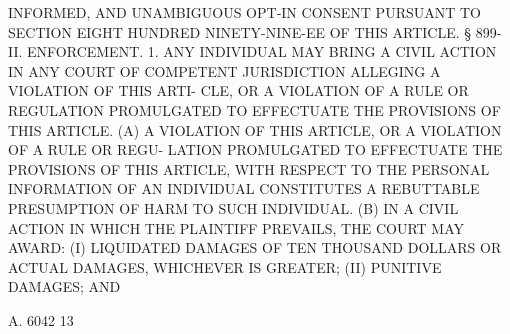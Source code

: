  INFORMED,  AND  UNAMBIGUOUS  OPT-IN  CONSENT  PURSUANT  TO SECTION EIGHT
 HUNDRED NINETY-NINE-EE OF THIS ARTICLE.
   § 899-II. ENFORCEMENT. 1. ANY INDIVIDUAL MAY BRING A CIVIL  ACTION  IN
 ANY  COURT  OF COMPETENT JURISDICTION ALLEGING A VIOLATION OF THIS ARTI-
 CLE, OR A VIOLATION OF A RULE OR REGULATION  PROMULGATED  TO  EFFECTUATE
 THE PROVISIONS OF THIS ARTICLE.
   (A)  A  VIOLATION  OF  THIS ARTICLE, OR A VIOLATION OF A RULE OR REGU-
 LATION PROMULGATED TO EFFECTUATE THE PROVISIONS OF  THIS  ARTICLE,  WITH
 RESPECT  TO  THE  PERSONAL  INFORMATION  OF  AN INDIVIDUAL CONSTITUTES A
 REBUTTABLE PRESUMPTION OF HARM TO SUCH INDIVIDUAL.
   (B) IN A CIVIL ACTION IN WHICH THE PLAINTIFF PREVAILS, THE  COURT  MAY
 AWARD:
   (I)  LIQUIDATED  DAMAGES  OF  TEN  THOUSAND DOLLARS OR ACTUAL DAMAGES,
 WHICHEVER IS GREATER;
   (II) PUNITIVE DAMAGES; AND

 A. 6042                            13
 
